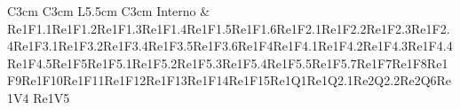 \begin{longtable}{C{3cm} C{3cm} L{5.5cm} C{3cm}}
Interno & Re1F1.1\newline Re1F1.2\newline Re1F1.3\newline Re1F1.4\newline Re1F1.5\newline Re1F1.6\newline  Re1F2.1\newline Re1F2.2\newline Re1F2.3\newline Re1F2.4\newline Re1F3.1\newline Re1F3.2\newline Re1F3.4\newline Re1F3.5\newline Re1F3.6\newline Re1F4\newline Re1F4.1\newline Re1F4.2\newline Re1F4.3\newline Re1F4.4\newline Re1F4.5\newline Re1F5\newline Re1F5.1\newline Re1F5.2\newline Re1F5.3\newline Re1F5.4\newline Re1F5.5\newline Re1F5.7\newline Re1F7\newline Re1F8\newline Re1F9\newline Re1F10\newline Re1F11\newline Re1F12\newline Re1F13\newline Re1F14\newline Re1F15\newline Re1Q1\newline  Re1Q2.1\newline Re2Q2.2\newline Re2Q6\newline Re1V4
\newline  Re1V5\\


\end{longtable}
